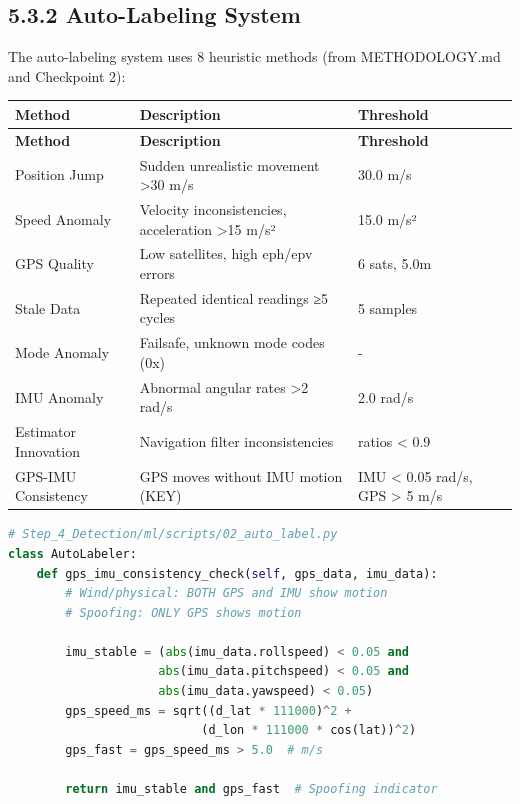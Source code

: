 \documentclass[12pt,a4paper]{article}
\begin{document}
\subsection{5.3.2 Auto-Labeling System}

The auto-labeling system uses 8 heuristic methods (from METHODOLOGY.md and Checkpoint 2):

\begin{longtable}{|p{3cm}|p{10cm}|p{2cm}|}
\hline
\textbf{Method} & \textbf{Description} & \textbf{Threshold} \\
\hline
\endfirsthead
\hline
\textbf{Method} & \textbf{Description} & \textbf{Threshold} \\
\hline
\endhead
\hline
Position Jump & Sudden unrealistic movement >30 m/s & 30.0 m/s \\
\hline
Speed Anomaly & Velocity inconsistencies, acceleration >15 m/s² & 15.0 m/s² \\
\hline
GPS Quality & Low satellites, high eph/epv errors & 6 sats, 5.0m \\
\hline
Stale Data & Repeated identical readings ≥5 cycles & 5 samples \\
\hline
Mode Anomaly & Failsafe, unknown mode codes (0x) & - \\
\hline
IMU Anomaly & Abnormal angular rates >2 rad/s & 2.0 rad/s \\
\hline
Estimator Innovation & Navigation filter inconsistencies & ratios < 0.9 \\
\hline
GPS-IMU Consistency & GPS moves without IMU motion (KEY) & IMU < 0.05 rad/s, GPS > 5 m/s \\
\hline
\end{longtable}

\begin{lstlisting}[language=python, style=pythonstyle]
# Step_4_Detection/ml/scripts/02_auto_label.py
class AutoLabeler:
    def gps_imu_consistency_check(self, gps_data, imu_data):
        # Wind/physical: BOTH GPS and IMU show motion
        # Spoofing: ONLY GPS shows motion
        
        imu_stable = (abs(imu_data.rollspeed) < 0.05 and 
                     abs(imu_data.pitchspeed) < 0.05 and
                     abs(imu_data.yawspeed) < 0.05)
        gps_speed_ms = sqrt((d_lat * 111000)^2 + 
                           (d_lon * 111000 * cos(lat))^2)
        gps_fast = gps_speed_ms > 5.0  # m/s
        
        return imu_stable and gps_fast  # Spoofing indicator
\end{lstlisting}
\end{document}
